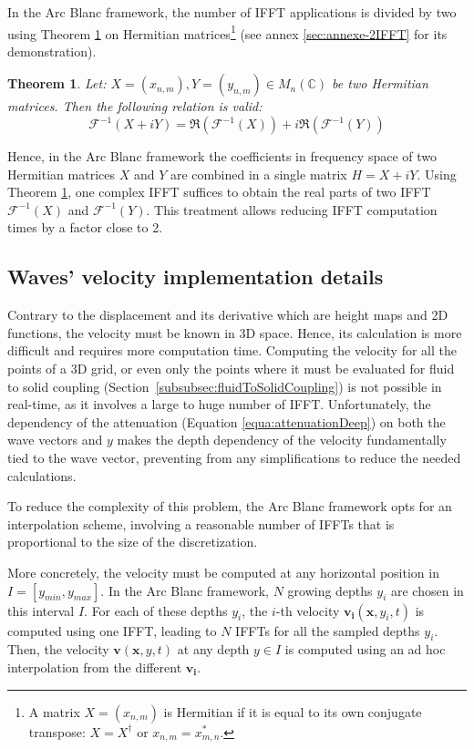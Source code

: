 \documentclass[final]{jcgt}
\newtheorem{theorem}{Theorem}
\def\framework{the Arc Blanc framework\xspace}
\begin{document}
In \framework, the number of IFFT applications is divided by two using Theorem \ref{theorem:ifft} on Hermitian matrices\footnote{A matrix $X=(x_{n,m})$ is Hermitian if it is equal to its own conjugate transpose: $X = X^{\dagger}$ or $x_{n,m}=x^*_{m,n}$.} (see annex \ref{sec:annexe-2IFFT} for its demonstration).
\begin{theorem}
	\label{theorem:ifft}
	Let: $X=(x_{n,m}), Y=(y_{n,m}) \in M_n(\mathbb{C})$ be two Hermitian matrices.
	Then the following relation is valid:
	\begin{equation}
		\mathcal{F}^{-1}\left(X+iY\right) =
		\Re\left(\mathcal{F}^{-1}\left(X\right)\right)
		+ i\Re\left(\mathcal{F}^{-1}\left(Y\right)\right)
	\end{equation}
\end{theorem}
Hence, in \framework the coefficients in frequency space of two Hermitian matrices $X$ and $Y$ are combined in a single matrix $H=X+iY$.
Using Theorem \ref{theorem:ifft}, one complex IFFT suffices to obtain the real parts of two IFFT $\mathcal{F}^{-1}\left(X\right)$ and $\mathcal{F}^{-1}\left(Y\right)$.
This treatment allows reducing IFFT computation times by a factor close to 2.

\subsection{Waves' velocity implementation details}
Contrary to the displacement and its derivative which are height maps and 2D functions, the velocity must be known in 3D space.
Hence, its calculation is more difficult and requires more computation time.
Computing the velocity for all the points of a 3D grid, or even only the points where it must be evaluated for fluid to solid coupling (Section~\ref{subsubsec:fluidToSolidCoupling}) is not possible in real-time, as it involves a large to huge number of IFFT.
Unfortunately, the dependency of the attenuation (Equation \ref{equa:attenuationDeep}) on both the wave vectors and $y$ makes the depth dependency of the velocity fundamentally tied to the wave vector, preventing from any simplifications to reduce the needed calculations.

To reduce the complexity of this problem, \framework opts for an interpolation scheme, involving a reasonable number of IFFTs that is proportional to the size of the discretization.

More concretely, the velocity must be computed at any horizontal position in $I=[y_{min}, y_{max}]$.
In \framework, $N$ growing depths $y_i$ are chosen in this interval $I$.
For each of these depths $y_i$, the $i$-th velocity $\mathbf{v_i}(\mathbf x,y_i,t)$ is computed using one IFFT, leading to $N$ IFFTs for all the sampled depths $y_i$.
Then, the velocity $\mathbf{v}(\mathbf x,y,t)$ at any depth $y\in I$ is computed using an ad hoc interpolation from the different $\mathbf{v_i}$.
\end{document}
